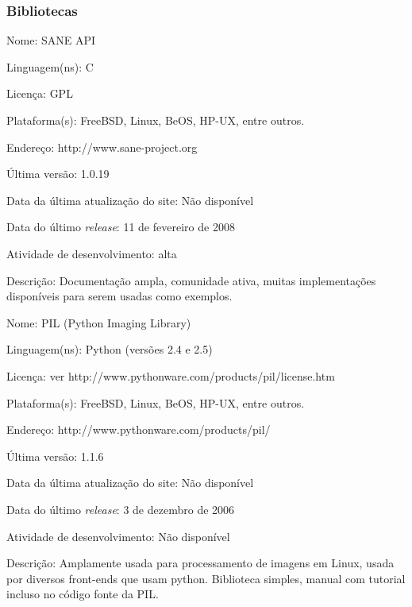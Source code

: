 \subsubsection{Bibliotecas}

\begin{description*}
	\item[Nome:] SANE API
	\item[Linguagem(ns):] C
	\item[Licença:] GPL
	\item[Plataforma(s):] FreeBSD, Linux, BeOS, HP-UX, entre outros.
	\item[Endereço:] http://www.sane-project.org
	\item[Última versão:] 1.0.19
	\item[Data da última atualização do site:] Não disponível
	\item[Data do último {\it release}:] 11 de fevereiro de 2008
	\item[Atividade de desenvolvimento:] alta
	\item[Descrição:] 
	Documentação ampla, comunidade ativa, muitas implementações disponíveis para serem usadas como exemplos.
\end{description*}

\begin{description*}
	\item[Nome:] PIL (Python Imaging Library)
	\item[Linguagem(ns):] Python (versões 2.4 e 2.5)
	\item[Licença:] ver http://www.pythonware.com/products/pil/license.htm
	\item[Plataforma(s):] FreeBSD, Linux, BeOS, HP-UX, entre outros.
	\item[Endereço:] http://www.pythonware.com/products/pil/
	\item[Última versão:] 1.1.6
	\item[Data da última atualização do site:] Não disponível
	\item[Data do último {\it release}:] 3 de dezembro de 2006
	\item[Atividade de desenvolvimento:] Não disponível
	\item[Descrição:] 
	Amplamente usada para processamento de imagens em Linux, usada por diversos front-ends que usam python. Biblioteca simples, manual com tutorial incluso no código fonte da PIL.
\end{description*}


